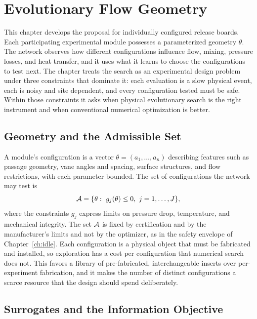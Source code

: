 \chapter{Evolutionary Flow Geometry}
\label{ch:evolutionary}

This chapter develops the proposal for individually configured release boards. Each participating experimental module possesses a parameterized geometry $\theta$. The network observes how different configurations influence flow, mixing, pressure losses, and heat transfer, and it uses what it learns to choose the configurations to test next. The chapter treats the search as an experimental design problem under three constraints that dominate it: each evaluation is a slow physical event, each is noisy and site dependent, and every configuration tested must be safe. Within those constraints it asks when physical evolutionary search is the right instrument and when conventional numerical optimization is better.

\section{Geometry and the Admissible Set}

A module's configuration is a vector $\theta=(a_1,\dots,a_n)$ describing features such as passage geometry, vane angles and spacing, surface structures, and flow restrictions, with each parameter bounded. The set of configurations the network may test is
\[
\Aset=\{\theta:\ g_j(\theta)\le0,\ j=1,\dots,J\},
\]
where the constraints $g_j$ express limits on pressure drop, temperature, and mechanical integrity. The set $\mathcal{A}$ is fixed by certification and by the manufacturer's limits and not by the optimizer, as in the safety envelope of Chapter~\ref{ch:idle}. Each configuration is a physical object that must be fabricated and installed, so exploration has a cost per configuration that numerical search does not. This favors a library of pre-fabricated, interchangeable inserts over per-experiment fabrication, and it makes the number of distinct configurations a scarce resource that the design should spend deliberately.

\section{Surrogates and the Information Objective}

